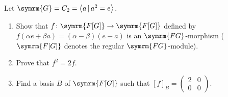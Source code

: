 \begin{exercise}
Let \(\symrm{G} = C_2 = \generatedby{a \vbar a^2 = e}\).
\begin{enumerate}[1)]
    \item Show that \(f \colon \symrm{F[G]} \to \symrm{F[G]}\) defined by \(f(\alpha e + \beta a) = (\alpha - \beta) (e - a)\) is an \(\symrm{FG}\)-morphism (\(\symrm{F[G]}\) denotes the regular \(\symrm{FG}\)-module).
    
    \item Prove that \(f^2 = 2f\).
    
    \item Find a basis \(B\) of \(\symrm{F[G]}\) such that \([f]_B = \begin{pmatrix}
        2 & 0 \\
        0 & 0
    \end{pmatrix}\).
\end{enumerate}
\end{exercise}
